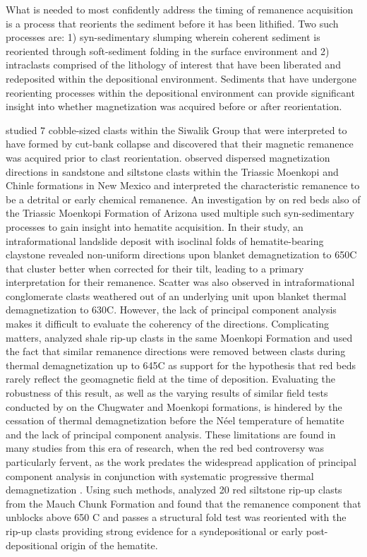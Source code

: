 \documentclass[draft]{agujournal2018}
\begin{document}
What is needed to most confidently address the timing of remanence acquisition is a process that reorients the sediment before it has been lithified. Two such processes are: 1) syn-sedimentary slumping wherein coherent sediment is reoriented through soft-sediment folding in the surface environment and 2) intraclasts comprised of the lithology of interest that have been liberated and redeposited within the depositional environment. Sediments that have undergone reorienting processes within the depositional environment can provide significant insight into whether magnetization was acquired before or after reorientation.

\citet{Tauxe1980a} studied 7 cobble-sized clasts within the Siwalik Group that were interpreted to have formed by cut-bank collapse and discovered that their magnetic remanence was acquired prior to clast reorientation. \citet{Molina-Garza1991a} observed dispersed magnetization directions in sandstone and siltstone clasts within the Triassic Moenkopi and Chinle formations in New Mexico and interpreted the characteristic remanence to be a detrital or early chemical remanence. An investigation by \citet{Purucker1980a} on red beds also of the Triassic Moenkopi Formation of Arizona used multiple such syn-sedimentary processes to gain insight into hematite acquisition. In their study, an intraformational landslide deposit with isoclinal folds of hematite-bearing claystone revealed non-uniform directions upon blanket demagnetization to 650\textdegree C that cluster better when corrected for their tilt, leading to a primary interpretation for their remanence. Scatter was also observed in intraformational conglomerate clasts weathered out of an underlying unit upon blanket thermal demagnetization to 630\textdegree C. However, the lack of principal component analysis makes it difficult to evaluate the coherency of the directions. Complicating matters, \citet{Larson1982b} analyzed shale rip-up clasts in the same Moenkopi Formation and used the fact that similar remanence directions were removed between clasts during thermal demagnetization up to 645\textdegree C as support for the hypothesis that red beds rarely reflect the geomagnetic field at the time of deposition. Evaluating the robustness of this result, as well as the varying results of similar field tests conducted by \citet{Liebes1982a} on the Chugwater and Moenkopi formations, is hindered by the cessation of thermal demagnetization before the N\'eel temperature of hematite and the lack of principal component analysis. These limitations are found in many studies from this era of research, when the red bed controversy was particularly fervent, as the work predates the widespread application of principal component analysis in conjunction with systematic progressive thermal demagnetization \citep{Kirschvink1980a, Van-Der-Voo2012a}. Using such methods, \citet{Opdyke2004a} analyzed 20 red siltstone rip-up clasts from the Mauch Chunk Formation and found that the remanence component that unblocks above 650 \textdegree C and passes a structural fold test was reoriented with the rip-up clasts providing strong evidence for a syndepositional or early post-depositional origin of the hematite.
\end{document}
